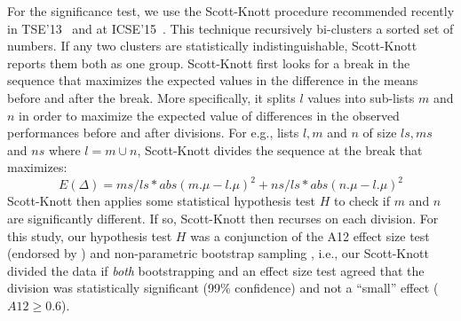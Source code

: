 \documentclass[sigconf,review, anonymous]{acmart}
\theoremstyle{break}
\theoremstyle{break}
\begin{document}
For the significance test,  we use the 
     Scott-Knott procedure  recommended  recently in TSE'13~\cite{mittas13} and at ICSE'15~\cite{ghotra2015revisiting}. This
     technique recursively bi-clusters a sorted
    set of numbers. If any two clusters are statistically indistinguishable, Scott-Knott
    reports them both as one group.
    Scott-Knott first looks for a break in the sequence that maximizes the expected
    values in the difference in the means before and after the break.
    More specifically,  it  splits $l$ values into sub-lists $m$ and $n$ in order to maximize the expected value of differences  in the observed performances before and after divisions. For e.g., lists $l,m$ and $n$ of size $ls,ms$ and $ns$ where $l=m\cup n$, Scott-Knott divides the sequence at the break that maximizes:
     \[E(\Delta)=ms/ls*abs(m.\mu - l.\mu)^2 + ns/ls*abs(n.\mu - l.\mu)^2\]
Scott-Knott then applies some statistical hypothesis test $H$ to check if $m$ and $n$ are significantly different. If so, Scott-Knott then recurses on each division.
    For this study, our hypothesis test $H$ was a conjunction of the A12 effect size test (endorsed by
    \cite{arcuri11})  and non-parametric bootstrap sampling \cite{efron94}, i.e., our Scott-Knott divided the data if {\em both}
    bootstrapping and an effect size test agreed that the division was statistically significant (99\% confidence) and not a ``small'' effect ($A12 \ge 0.6$).
   
\end{document}
